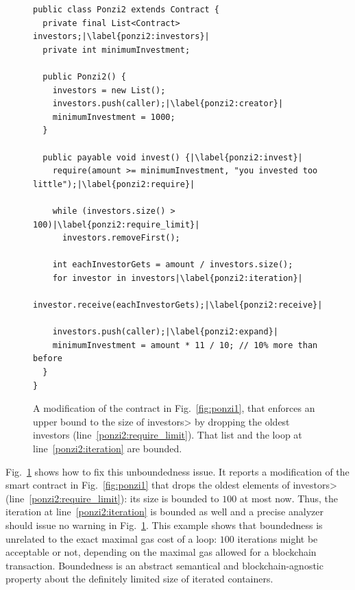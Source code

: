 \begin{figure}[t]
  \begin{lstlisting}[language=pseudo]
public class Ponzi2 extends Contract {
  private final List<Contract> investors;|\label{ponzi2:investors}|
  private int minimumInvestment;

  public Ponzi2() {
    investors = new List();
    investors.push(caller);|\label{ponzi2:creator}|
    minimumInvestment = 1000;
  }

  public payable void invest() {|\label{ponzi2:invest}|
    require(amount >= minimumInvestment, "you invested too little");|\label{ponzi2:require}|

    while (investors.size() > 100)|\label{ponzi2:require_limit}|
      investors.removeFirst();

    int eachInvestorGets = amount / investors.size();
    for investor in investors|\label{ponzi2:iteration}|
      investor.receive(eachInvestorGets);|\label{ponzi2:receive}|

    investors.push(caller);|\label{ponzi2:expand}|
    minimumInvestment = amount * 11 / 10; // 10% more than before
  }
}
  \end{lstlisting}
  \caption{A modification of the contract in Fig.~\ref{fig:ponzi1}, that enforces
    an upper bound to the size of \<investors> by dropping the oldest investors
    (line~\ref{ponzi2:require_limit}).
    That list and the loop at line~\ref{ponzi2:iteration} are bounded.}
  \label{fig:ponzi2}
\end{figure}
%
Fig.~\ref{fig:ponzi2} shows how to fix this unboundedness issue.
It reports a modification of the smart contract in Fig.~\ref{fig:ponzi1} that
drops the oldest elements of \<investors> (line~\ref{ponzi2:require_limit}):
its size is bounded to $100$ at most now.
Thus, the iteration at line~\ref{ponzi2:iteration}
is bounded as well and a precise analyzer should issue no warning in Fig.~\ref{fig:ponzi2}.
This example shows that boundedness is unrelated to the exact maximal gas cost of a loop:
$100$ iterations might be acceptable or not, depending on the maximal gas allowed
for a blockchain transaction. Boundedness is an abstract semantical and blockchain-agnostic
property about the definitely limited size of iterated containers.

